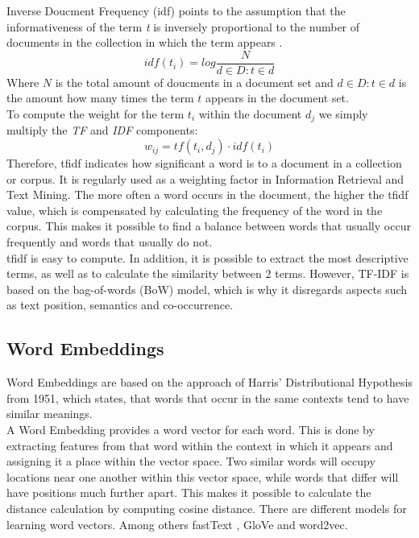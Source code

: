 \documentclass[a4paper, 11pt,titlepage,oneside,openany]{book}
\begin{document}
\noindent Inverse Doucment Frequency (\gls{idf}) points to the assumption that the informativeness of the term \textit{t} is inversely proportional to the number of documents in the collection in which the term appears \cite{IR-book}.\\
\[
idf(t_i)=log\frac{N}{d \in D : t \in d}
\]
Where $N$ is the total amount of doucments in a document set and $d \in D : t \in d$ is the amount how many times the term $t$ appears in the document set.\\

\noindent To compute the weight for the term $t_i$ within the document $d_j$ we simply multiply the \textit{TF} and \textit{IDF} components:
\[
w_{ij}=tf(t_i, d_j)\cdot idf(t_i)
\]
Therefore, \Gls{tfidf} indicates how significant a word is to a document in a collection or corpus. It is regularly used as a weighting factor in Information Retrieval and Text Mining. 
\newpage
\noindent The more often a word occurs in the document, the higher the \gls{tfidf} value, which is compensated by calculating the frequency of the word in the corpus. This makes it possible to find a balance between words that usually occur frequently and words that usually do not.\\
\noindent \Gls{tfidf} is easy to compute. In addition, it is possible to extract the most descriptive terms, as well as to calculate the similarity between 2 terms. However, TF-IDF is based on the bag-of-words (BoW) model, which is why it disregards aspects such as text position, semantics and co-occurrence.

\subsection{Word Embeddings}
Word Embeddings are based on the approach of Harris' Distributional Hypothesis \cite{distributionalhypothesis} from 1951, which states, that words that occur in the same contexts tend to have similar meanings. \\
\noindent A Word Embedding provides a word vector for each word. This is done by extracting features from that word within the context in which it appears and assigning it a place within the vector space. Two similar words will occupy locations near one another within this vector space, while words that differ will have positions much further apart. This makes it possible to calculate the distance calculation by computing cosine distance. There are different models for learning word vectors. Among others fastText \cite{fasttext}, GloVe \cite{glove} and word2vec. \\
\end{document}
